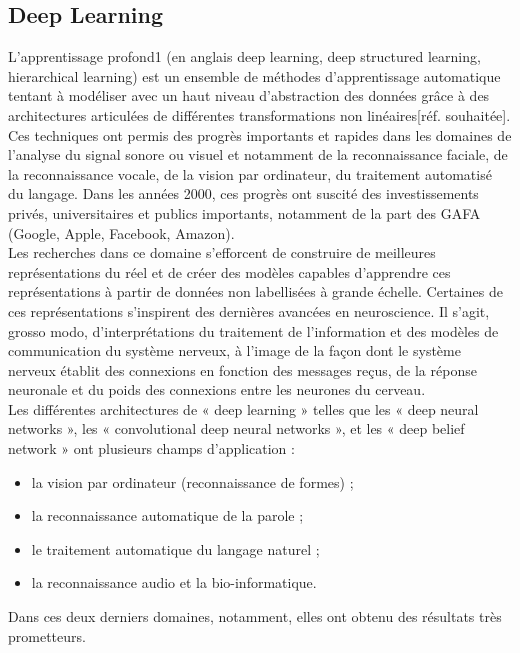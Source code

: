 \subsection{Deep Learning}
L'apprentissage profond1 (en anglais deep learning, deep structured learning, hierarchical learning) est un ensemble de méthodes d'apprentissage automatique tentant à modéliser avec un haut niveau d’abstraction des données grâce à des architectures articulées de différentes transformations non linéaires[réf. souhaitée]. Ces techniques ont permis des progrès importants et rapides dans les domaines de l'analyse du signal sonore ou visuel et notamment de la reconnaissance faciale, de la reconnaissance vocale, de la vision par ordinateur, du traitement automatisé du langage. Dans les années 2000, ces progrès ont suscité des investissements privés, universitaires et publics importants, notamment de la part des GAFA (Google, Apple, Facebook, Amazon).\\[0.5cm]
Les recherches dans ce domaine s’efforcent de construire de meilleures représentations du réel et de créer des modèles capables d’apprendre ces représentations à partir de données non labellisées à grande échelle. Certaines de ces représentations s’inspirent des dernières avancées en neuroscience. Il s'agit, grosso modo, d'interprétations du traitement de l’information et des modèles de communication du système nerveux, à l'image de la façon dont le système nerveux établit des connexions en fonction des messages reçus, de la réponse neuronale et du poids des connexions entre les neurones du cerveau.\\
Les différentes architectures de « deep learning » telles que les « deep neural networks », les « convolutional deep neural networks », et les « deep belief network » ont plusieurs champs d’application :
\begin{itemize}
\item la vision par ordinateur (reconnaissance de formes) ;
\item la reconnaissance automatique de la parole ;
\item le traitement automatique du langage naturel ;
\item la reconnaissance audio et la bio-informatique.
\end{itemize}
Dans ces deux derniers domaines, notamment, elles ont obtenu des résultats très prometteurs.

